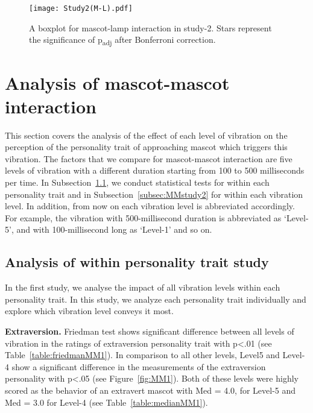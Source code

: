 \begin{figure}[!htb]
    \centering
    \texttt{[image: Study2(M-L).pdf]}
    \caption[]{A boxplot for mascot-lamp interaction in study-2.
    Stars represent the significance of p\textsubscript{adj} after Bonferroni correction.\footnotemark}
    \label{fig:ML2}
\end{figure}
\section{Analysis of mascot-mascot interaction}
\label{sec:m-m}
This section covers the analysis of the effect of each level of vibration on the perception
of the personality trait of approaching mascot which triggers this vibration.
The factors that we compare for mascot-mascot interaction are five levels of vibration
with a different duration starting from 100 to 500 milliseconds per time.
In Subsection~\ref{subsec:MMstudy1}, we conduct statistical tests for within each
personality trait and in Subsection~\ref{subsec:MMstudy2} for within each vibration level.
In addition, from now on each vibration level is abbreviated accordingly.
For example, the vibration with 500-millisecond duration is abbreviated
as ‘Level-5’, and with 100-millisecond long as ‘Level-1’ and so on.

\subsection{Analysis of within personality trait study}
\label{subsec:MMstudy1}
In the first study, we analyse the impact of all vibration levels within each personality trait.
In this study, we analyze each personality trait individually and explore which vibration
level conveys it most.

\par\textbf{Extraversion.}
Friedman test shows significant difference between all levels of vibration in the
ratings of extraversion personality trait with p<.01 (see Table~\ref{table:friedmanMM1}).
In comparison to all other levels, Level5 and Level-4 show a significant difference
in the measurements of the extraversion personality with p<.05 (see Figure~\ref{fig:MM1}).
Both of these levels were highly scored as the behavior of an extravert mascot
with Med = 4.0, for Level-5 and Med = 3.0 for Level-4 (see Table~\ref{table:medianMM1}).

